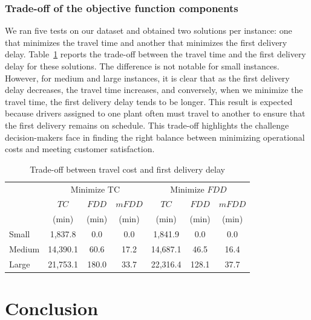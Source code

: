 \documentclass{article}
\begin{document}
\subsubsection{Trade-off of the objective function components}

We ran five tests on our dataset and obtained two solutions per instance: one that minimizes the travel time and another that minimizes the first delivery delay. Table~\ref{tab:cdp_tradeoff} reports the trade-off between the travel time and the first delivery delay for these solutions. The difference is not notable for small instances. However, for medium and large instances, it is clear that as the first delivery delay decreases, the travel time increases, and conversely, when we minimize the travel time, the first delivery delay tends to be longer. This result is expected because drivers assigned to one plant often must travel to another to ensure that the first delivery remains on schedule. This trade-off highlights the challenge decision-makers face in finding the right balance between minimizing operational costs and meeting customer satisfaction.

\begin{table}[!ht]
    \centering
    \caption{Trade-off between travel cost and first delivery delay}
    \label{tab:cdp_tradeoff}
    \begin{adjustbox}{max width=0.8\textwidth}
    \begin{tabular}{lcccccc}
    \toprule
     & \multicolumn{3}{c}{Minimize TC} & \multicolumn{3}{c}{Minimize $FDD$} \\
     \cmidrule(l){2-4} \cmidrule(l){5-7}
     & $TC$ & $FDD$ & $mFDD$ & $TC$ & $FDD$ & $mFDD$ \\
     & (min) & (min) & (min) & (min) & (min) & (min) \\
    \midrule
    Small & 1,837.8 & 0.0 & 0.0 & 1,841.9 & 0.0 & 0.0 \\
    Medium & 14,390.1 & 60.6 & 17.2 & 14,687.1 & 46.5 & 16.4 \\
    Large & 21,753.1 & 180.0 & 33.7 & 22,316.4 & 128.1 & 37.7 \\
    \bottomrule
    \end{tabular}
\end{adjustbox}
    
\end{table}

\section{Conclusion}
\label{sec:cdp_concl}
\end{document}
